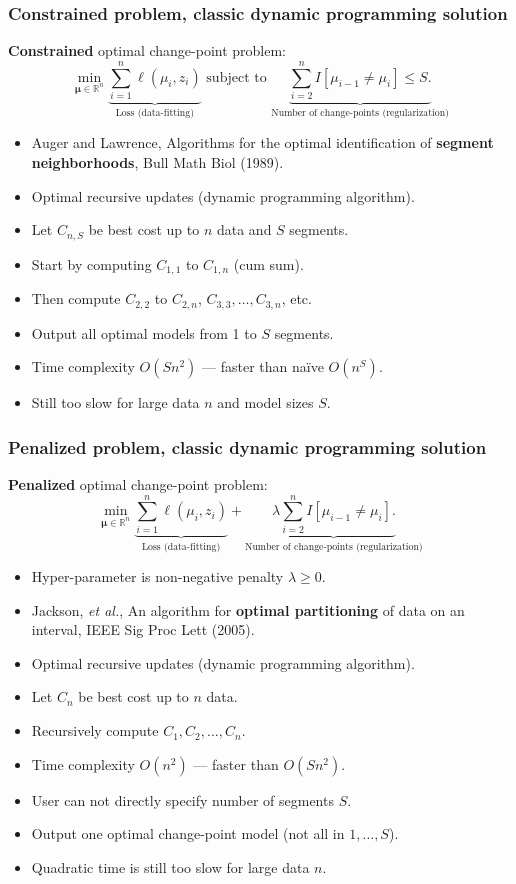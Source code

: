 \documentclass{beamer}
\newcommand{\RR}{\mathbb R}
\begin{document}
\begin{frame}
  \frametitle{Constrained problem, classic dynamic programming solution}
  \textbf{Constrained} optimal change-point problem:
$$
\min_{
  \mathbf \mu\in\RR^{n}
}
\underbrace{\sum_{i=1}^{n} \ell( \mu_i,  z_i)}_{\text{Loss (data-fitting)}}\text{ subject to }\underbrace{\sum_{i=2}^n I[\mu_{i-1}\neq \mu_i] \leq S.}_{\text{Number of change-points (regularization)}}
$$
\begin{itemize}
\item Auger and Lawrence, Algorithms for the optimal identification of
  \textbf{segment neighborhoods}, Bull Math Biol (1989).
\item Optimal recursive updates (dynamic programming algorithm).
\item Let $C_{n,S}$ be best cost up to $n$ data and $S$ segments.
\item Start by computing $C_{1,1}$ to $C_{1,n}$ (cum sum).
\item Then compute $C_{2,2}$ to $C_{2,n}$, $C_{3,3},\dots,C_{3,n}$, etc.
\item Output all optimal models from 1 to $S$ segments.
\item Time complexity $O(S n^2)$ --- faster than naïve $O(n^S)$.
\item Still too slow for large data $n$ and model sizes $S$.
\end{itemize}
\end{frame}


\begin{frame}
  \frametitle{Penalized problem, classic dynamic programming solution}
  \textbf{Penalized} optimal change-point problem:
$$
\min_{
  \mathbf \mu\in\RR^{n}
}
\underbrace{\sum_{i=1}^{n} \ell( \mu_i,  z_i)}_{\text{Loss (data-fitting)}} + \underbrace{\lambda\sum_{i=2}^n I[\mu_{i-1}\neq \mu_i].}_{\text{Number of change-points (regularization)}}
$$
\begin{itemize}
\item Hyper-parameter is non-negative penalty $\lambda\geq 0$.
\item Jackson, \emph{et al.}, An algorithm for \textbf{optimal
    partitioning} of data on an interval, IEEE Sig Proc Lett (2005).
\item Optimal recursive updates (dynamic programming algorithm).
\item Let $C_{n}$ be best cost up to $n$ data.
\item Recursively compute $C_{1}, C_2,\dots, C_{n}$.
\item Time complexity $O(n^2)$ --- faster than $O(S n^2)$.
\item User can not directly specify number of segments $S$.
\item Output one optimal change-point model (not all in $1,\dots,S$).
\item Quadratic time is still too slow for large data $n$.
\end{itemize}
\end{frame}
\end{document}
